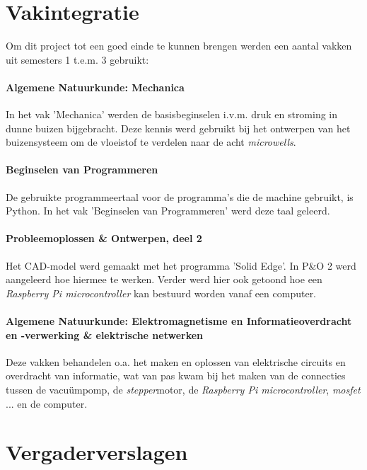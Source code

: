 \documentclass[a4paper,twoside,kulak]{kulakreport} %
\begin{document}
\clearpage

\section*{Vakintegratie}
Om dit project tot een goed einde te kunnen brengen werden een aantal vakken uit semesters 1 t.e.m. 3 gebruikt:

\paragraph{Algemene Natuurkunde: Mechanica}

In het vak 'Mechanica' werden de basisbeginselen i.v.m. druk en stroming in dunne buizen bijgebracht. Deze kennis werd gebruikt bij het ontwerpen van het buizensysteem om de vloeistof te verdelen naar de acht \textit{microwells}.

\paragraph{Beginselen van Programmeren}

De gebruikte programmeertaal voor de programma's die de machine gebruikt, is Python. In het vak 'Beginselen van Programmeren' werd deze taal geleerd. 

\paragraph{Probleemoplossen \& Ontwerpen, deel 2}

Het CAD-model werd gemaakt met het programma 'Solid Edge'. In P\&O 2 werd aangeleerd hoe hiermee te werken. Verder werd hier ook getoond hoe een \textit{Raspberry Pi microcontroller} kan bestuurd worden vanaf een computer. 

\paragraph{Algemene Natuurkunde: Elektromagnetisme en Informatieoverdracht en -verwerking \& elektrische netwerken}

Deze vakken behandelen o.a. het maken en oplossen van elektrische circuits en overdracht van informatie, wat van pas kwam bij het maken van de connecties tussen de vacuümpomp, de \textit{stepper}motor, de \textit{Raspberry Pi microcontroller}, \textit{mosfet} ... en de computer.

\clearpage

\section*{Vergaderverslagen}






 
\end{document}

